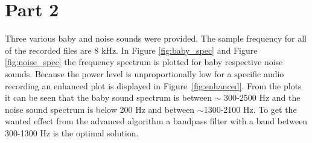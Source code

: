 \newpage
\section{Part 2}
Three various baby and noise sounds were provided. The sample frequency for all of the recorded 
files are 8 kHz. In Figure \ref{fig:baby_spec} and Figure \ref{fig:noise_spec} the frequency 
spectrum is plotted for baby respective noise sounds. Because the power level is unproportionally 
low for a specific audio recording an enhanced plot is displayed in Figure~\ref{fig:enhanced}. 
From the plots it can be seen that the baby sound spectrum is between $\sim$ 300-2500 Hz and the 
noise sound spectrum is below 200 Hz and between $\sim$1300-2100 Hz. To get the wanted effect from 
the advanced algorithm a bandpass filter with a band between 300-1300 Hz is the optimal solution. 

%

